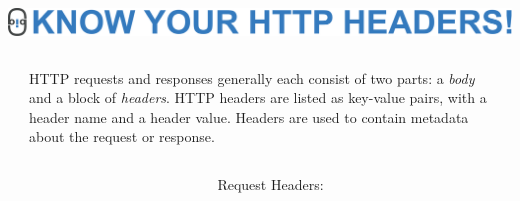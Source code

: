 \documentclass[final]{beamer}
\begin{document}
  \begin{frame}{}
    \begin{minipage}{\textwidth}
      \centering
      \includegraphics[]{./title-headers.pdf}
    \end{minipage}

    \vspace{0.5in}

    \begin{columns}
      \begin{column}{0.2\textwidth}
      \end{column}
      \begin{column}{0.6\textwidth}
        \begin{block}{}
          \large
            HTTP requests and responses generally each consist of two parts: a
            \emph{body} and a block of \emph{headers}. HTTP headers are listed
            as key-value pairs, with a header name and a header value. Headers
            are used to contain metadata about the request or response.
          \normalsize
        \end{block}
      \end{column}
      \begin{column}{0.2\textwidth}
      \end{column}
    \end{columns}

    \vspace{1.0in}

    \begin{columns}
      \begin{column}{0.1\textwidth}
      \end{column}
      \begin{column}{0.4\textwidth}
        \begin{block}{\huge{Request Headers:}}

          \vspace{0.3in}


\end{block}
\end{column}
\end{columns}
\end{frame}
\end{document}

